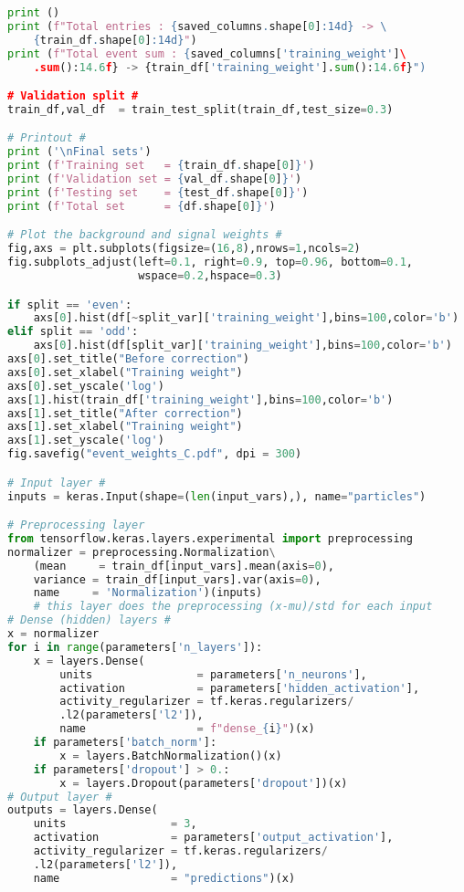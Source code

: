 \begin{lstlisting}[language=Python, caption=DNN setup for the \wwgg semi-leptonic final state, label={dnncode}]
print ()
print (f"Total entries : {saved_columns.shape[0]:14d} -> \
    {train_df.shape[0]:14d}")
print (f"Total event sum : {saved_columns['training_weight']\
    .sum():14.6f} -> {train_df['training_weight'].sum():14.6f}")

# Validation split #
train_df,val_df  = train_test_split(train_df,test_size=0.3)

# Printout #
print ('\nFinal sets')
print (f'Training set   = {train_df.shape[0]}')
print (f'Validation set = {val_df.shape[0]}')
print (f'Testing set    = {test_df.shape[0]}')
print (f'Total set      = {df.shape[0]}')

# Plot the background and signal weights #
fig,axs = plt.subplots(figsize=(16,8),nrows=1,ncols=2)
fig.subplots_adjust(left=0.1, right=0.9, top=0.96, bottom=0.1,
                    wspace=0.2,hspace=0.3)

if split == 'even':
    axs[0].hist(df[~split_var]['training_weight'],bins=100,color='b')
elif split == 'odd':
    axs[0].hist(df[split_var]['training_weight'],bins=100,color='b')
axs[0].set_title("Before correction")
axs[0].set_xlabel("Training weight")
axs[0].set_yscale('log')
axs[1].hist(train_df['training_weight'],bins=100,color='b')
axs[1].set_title("After correction")
axs[1].set_xlabel("Training weight")
axs[1].set_yscale('log')
fig.savefig("event_weights_C.pdf", dpi = 300)

# Input layer #
inputs = keras.Input(shape=(len(input_vars),), name="particles")

# Preprocessing layer
from tensorflow.keras.layers.experimental import preprocessing
normalizer = preprocessing.Normalization\
    (mean     = train_df[input_vars].mean(axis=0),
    variance = train_df[input_vars].var(axis=0),
    name     = 'Normalization')(inputs)
    # this layer does the preprocessing (x-mu)/std for each input
# Dense (hidden) layers #
x = normalizer
for i in range(parameters['n_layers']):
    x = layers.Dense(
        units                = parameters['n_neurons'], 
        activation           = parameters['hidden_activation'], 
        activity_regularizer = tf.keras.regularizers/
        .l2(parameters['l2']),
        name                 = f"dense_{i}")(x)
    if parameters['batch_norm']:
        x = layers.BatchNormalization()(x)
    if parameters['dropout'] > 0.:
        x = layers.Dropout(parameters['dropout'])(x)
# Output layer #
outputs = layers.Dense(
    units                = 3, 
    activation           = parameters['output_activation'],
    activity_regularizer = tf.keras.regularizers/
    .l2(parameters['l2']),
    name                 = "predictions")(x)


\end{lstlisting}
